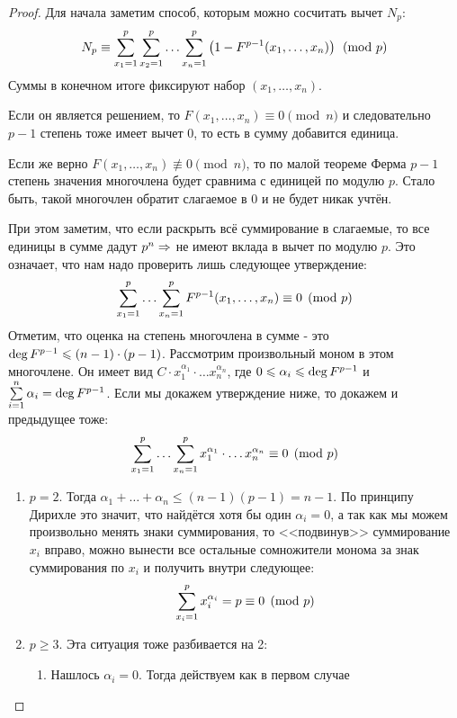 \begin{proof}
	Для начала заметим способ, которым можно сосчитать вычет $N_p$:
	\[
		N_p \equiv \sum\limits_{x_1 = 1}^p \sum\limits_{x_2 = 1}^p \ldots \sum\limits_{x_n = 1}^p \left(1 - F^{p - 1}(x_1, \ldots, x_n)\right) \pmod p
	\]
	Суммы в конечном итоге фиксируют набор $(x_1, \ldots, x_n)$.
	
	Если он является решением, то $F(x_1, \ldots, x_n) \equiv 0 \pmod n$ и следовательно $p - 1$ степень тоже имеет вычет 0, то есть в сумму добавится единица.
	
	Если же верно $F(x_1, \ldots, x_n) \not\equiv 0 \pmod n$, то по малой теореме Ферма $p - 1$ степень значения многочлена будет сравнима с единицей по модулю $p$. Стало быть, такой многочлен обратит слагаемое в 0 и не будет никак учтён.
	
	При этом заметим, что если раскрыть всё суммирование в слагаемые, то все единицы в сумме дадут $p^n \Rightarrow$ не имеют вклада в вычет по модулю $p$. Это означает, что нам надо проверить лишь следующее утверждение:
	\[
		\sum\limits_{x_1 = 1}^p \ldots \sum\limits_{x_n = 1}^p F^{p - 1}(x_1, \ldots, x_n) \equiv 0 \pmod p
	\]
	Отметим, что оценка на степень многочлена в сумме - это $\operatorname{deg} F^{p - 1} \leqslant (n - 1) \cdot (p - 1)$. Рассмотрим произвольный моном в этом многочлене. Он имеет вид $C \cdot x_1^{\alpha_1} \cdot \ldots x_n^{\alpha_n}$, где $0 \leqslant \alpha_i \leqslant \operatorname{deg} F^{p - 1}$ и $\sum\limits_{i = 1}^n \alpha_i = \operatorname{deg} F^{p - 1}$. Если мы докажем утверждение ниже, то докажем и предыдущее тоже:
	\[
		\sum\limits_{x_1 = 1}^p \ldots \sum\limits_{x_n = 1}^p x_1^{\alpha_1} \cdot \ldots x_n^{\alpha_n} \equiv 0 \pmod p
	\]
	\begin{enumerate}
		\item $p = 2$. Тогда $\alpha_1 + \ldots + \alpha_n \le (n - 1)(p - 1) = n - 1$. По принципу Дирихле это значит, что найдётся хотя бы один $\alpha_i = 0$, а так как мы можем произвольно менять знаки суммирования, то <<подвинув>> суммирование $x_i$ вправо, можно вынести все остальные сомножители монома за знак суммирования по $x_i$ и получить внутри следующее:
		\[
			\sum\limits_{x_i = 1}^p x_i^{\alpha_i} = p \equiv 0 \pmod p
		\]
		
		\item $p \ge 3$. Эта ситуация тоже разбивается на 2:
		\begin{enumerate}
			\item Нашлось $\alpha_i = 0$. Тогда действуем как в первом случае
			

\end{enumerate}
\end{enumerate}
\end{proof}
